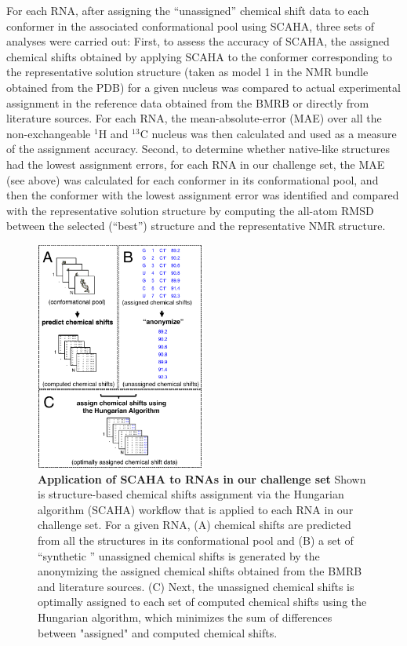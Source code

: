 \documentclass[journal=jcisd8,manuscript=article,layout=onecolumn]{achemso}
\begin{document}
For each RNA, after assigning the ``unassigned'' chemical shift data to each conformer in the associated conformational pool using SCAHA, three sets of analyses were carried out:  First, to assess the accuracy of SCAHA, the assigned chemical shifts obtained by applying SCAHA to the conformer corresponding to the representative solution structure (taken as model 1 in the NMR bundle obtained from the PDB) for a given nucleus was compared to actual experimental assignment in the reference data obtained from the BMRB or directly from literature sources. For each RNA, the mean-absolute-error (MAE) over all the non-exchangeable $^{1}$H and $^{13}$C nucleus was then calculated and used as a measure of the assignment accuracy. Second, to determine whether native-like structures had the lowest assignment errors, for each RNA in our challenge set, the MAE (see above) was calculated for each conformer in its conformational pool, and then the conformer with the lowest assignment error was identified and compared with the representative solution structure by computing the all-atom RMSD between the selected (``best'')  structure and the representative NMR structure.  
\begin{figure}[h!]
  \centering
       \includegraphics[width=0.5\textwidth]{figure_0}
  \caption{\textbf{Application of SCAHA to RNAs in our challenge set} Shown is structure-based chemical shifts assignment via the Hungarian algorithm (SCAHA) workflow that is applied to each RNA in our challenge set. For a given RNA, (A) chemical shifts are predicted from all the structures in its conformational pool and (B) a set of ``synthetic '' unassigned chemical shifts is generated by the anonymizing the assigned chemical shifts obtained from the BMRB and literature sources. (C) Next, the unassigned chemical shifts is optimally assigned to each set of computed chemical shifts using the Hungarian algorithm, which minimizes the sum of differences between "assigned" and computed chemical shifts.}
  \label{fig:illustrate}
\end{figure}
\end{document}
